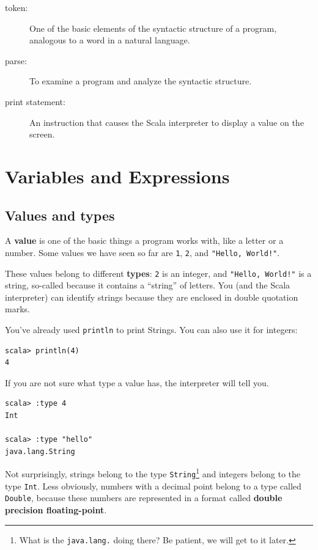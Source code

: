 \documentclass[10pt]{book}
\begin{document}
\begin{description}
\item[token:]  One of the basic elements of the syntactic structure of a program, analogous to a word in a natural language.

\item[parse:]  To examine a program and analyze the syntactic structure.

\item[print statement:]  An instruction that causes the Scala interpreter to display a value on the screen.

\end{description}


\chapter{Variables and Expressions}

\section{Values and types}

A {\bf value} is one of the basic things a program works with, like a letter or a number.  Some values we have seen so far are {\tt 1}, {\tt 2}, and {\tt "Hello, World!"}.

These values belong to different {\bf types}: {\tt 2} is an integer, and {\tt "Hello, World!"} is a
 string, so-called because it contains a ``string'' of letters. You (and the Scala interpreter) can
 identify strings because they are enclosed in double quotation marks.


You've already used \verb"println" to print Strings. You can also use it for integers:

\beforeverb
\begin{verbatim}
scala> println(4)
4
\end{verbatim}
\afterverb

If you are not sure what type a value has, the interpreter will tell you.

\beforeverb
\begin{verbatim}
scala> :type 4
Int

scala> :type "hello"
java.lang.String
\end{verbatim}
\afterverb
%
Not surprisingly, strings belong to the type {\tt String}\footnote{What is the {\tt java.lang.} doing there? Be patient, we will get to it later.} and
integers belong to the type {\tt Int}.  Less obviously, numbers
with a decimal point belong to a type called {\tt Double},
because these numbers are represented in a format called {\bf double precision floating-point}.
\end{document}
